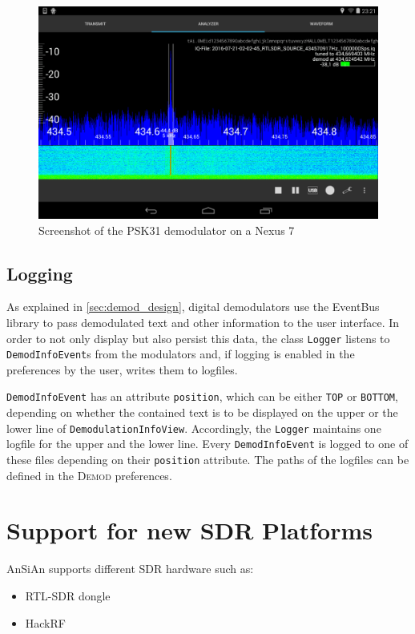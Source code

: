 \begin{figure}
	\centering
	\includegraphics[width=1\linewidth]{gfx/psk31/psk31_android_screenshot.png}
	\caption{Screenshot of the PSK31 demodulator on a Nexus 7}
	\label{fig:psk31_android_screenshot}
\end{figure}

\subsection{Logging\label{sec:logging}}

As explained in \autoref{sec:demod_design}, digital demodulators use the EventBus library to pass demodulated text and other information to the user interface. In order to not only display but also persist this data, the class \texttt{Logger} listens to \texttt{DemodInfoEvent}s from the modulators and, if logging is enabled in the preferences by the user, writes them to logfiles.

\texttt{DemodInfoEvent} has an attribute \texttt{position}, which can be either \texttt{TOP} or \texttt{BOTTOM}, depending on whether the contained text is to be displayed on the upper or the lower line of \texttt{DemodulationInfoView}. Accordingly, the \texttt{Logger} maintains one logfile for the upper and the lower line. Every \texttt{DemodInfoEvent} is logged to one of these files depending on their \texttt{position} attribute. The paths of the logfiles can be defined in the \textsc{Demod} preferences.


\section{Support for new SDR Platforms}

\ac{AnSiAn} supports different \ac{SDR} hardware such as:
\begin{itemize}
	\item RTL-SDR dongle
	\item HackRF
\end{itemize}

